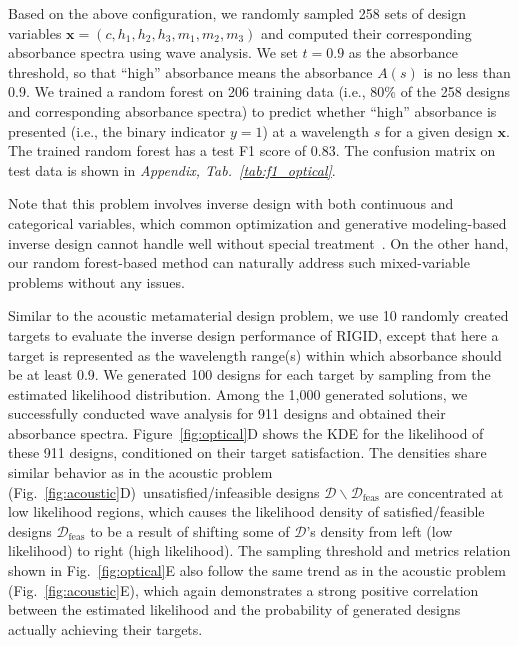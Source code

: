 \documentclass{article}
\begin{document}
Based on the above configuration, we randomly sampled 258 sets of design variables $\mathbf{x} = (c, h_1, h_2, h_3, m_1, m_2, m_3)$ and computed their corresponding absorbance spectra using wave analysis. We set $t=0.9$ as the absorbance threshold, so that ``high'' absorbance means the absorbance $A(s)$ is no less than 0.9. We trained a random forest on 206 training data (i.e., 80\% of the 258 designs and corresponding absorbance spectra) to predict whether ``high'' absorbance is presented (i.e., the binary indicator $y=1$) at a wavelength $s$ for a given design $\mathbf{x}$. The trained random forest has a test F1 score of 0.83. The confusion matrix on test data is shown in \textit{Appendix, Tab.~\ref{tab:f1_optical}}.

Note that this problem involves inverse design with both continuous and categorical variables, which common optimization and generative modeling-based inverse design cannot handle well without special treatment~\cite{zhang2020bayesian,ma2020vaem,xu2018synthesizing}. On the other hand, our random forest-based method can naturally address such mixed-variable problems without any issues.

Similar to the acoustic metamaterial design problem, we use 10 randomly created targets to evaluate the inverse design performance of RIGID, except that here a target is represented as the wavelength range(s) within which absorbance should be at least 0.9. We generated 100 designs for each target by sampling from the estimated likelihood distribution. Among the 1,000 generated solutions, we successfully conducted wave analysis for 911 designs and obtained their absorbance spectra. Figure~\ref{fig:optical}D shows the KDE for the likelihood of these 911 designs, conditioned on their target satisfaction. The densities share similar behavior as in the acoustic problem (Fig.~\ref{fig:acoustic}D)~\textemdash unsatisfied/infeasible designs $\mathcal{D}\backslash\mathcal{D}_\text{feas}$ are concentrated at low likelihood regions, which causes the likelihood density of satisfied/feasible designs $\mathcal{D}_\text{feas}$ to be a result of shifting some of $\mathcal{D}$'s density from left (low likelihood) to right (high likelihood). The sampling threshold and metrics relation shown in Fig.~\ref{fig:optical}E also follow the same trend as in the acoustic problem (Fig.~\ref{fig:acoustic}E), which again demonstrates a strong positive correlation between the estimated likelihood and the probability of generated designs actually achieving their targets.
\end{document}
